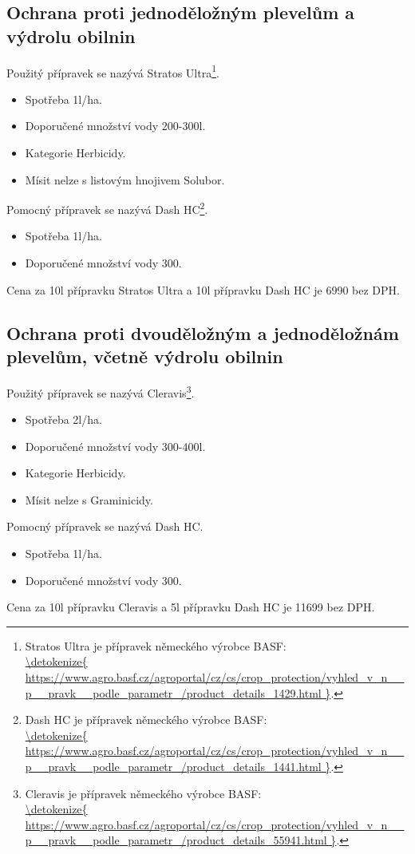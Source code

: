 \documentclass[11pt,a4paper,titlepage]{article}
\begin{document}
\subsection{Ochrana proti jednoděložným plevelům a výdrolu obilnin}
Použitý přípravek se nazývá Stratos Ultra\footnote{Stratos Ultra je přípravek německého výrobce BASF: \\\url{\detokenize{
https://www.agro.basf.cz/agroportal/cz/cs/crop_protection/vyhled_v_n__p__pravk__podle_parametr_/product_details_1429.html
}}.}.
\begin{itemize}
  \item Spotřeba 1l/ha.
  \item Doporučené množství vody 200-300l.
  \item Kategorie Herbicidy.
  \item Mísit nelze s listovým hnojivem Solubor.
\end{itemize}
Pomocný přípravek se nazývá Dash HC\footnote{Dash HC je přípravek německého výrobce BASF: \\\url{\detokenize{
https://www.agro.basf.cz/agroportal/cz/cs/crop_protection/vyhled_v_n__p__pravk__podle_parametr_/product_details_1441.html
}}.}.
\begin{itemize}
  \item Spotřeba 1l/ha.
  \item Doporučené množství vody 300.
\end{itemize}
Cena za 10l přípravku Stratos Ultra a 10l přípravku Dash HC je 6990 bez DPH.

\subsection{Ochrana proti dvouděložným a jednoděložnám plevelům, včetně výdrolu obilnin}
Použitý přípravek se nazývá Cleravis\footnote{Cleravis je přípravek německého výrobce BASF: \\\url{\detokenize{
https://www.agro.basf.cz/agroportal/cz/cs/crop_protection/vyhled_v_n__p__pravk__podle_parametr_/product_details_55941.html
}}.}.
\begin{itemize}
  \item Spotřeba 2l/ha.
  \item Doporučené množství vody 300-400l.
  \item Kategorie Herbicidy.
  \item Mísit nelze s Graminicidy.
\end{itemize}
Pomocný přípravek se nazývá Dash HC.
\begin{itemize}
  \item Spotřeba 1l/ha.
  \item Doporučené množství vody 300.
\end{itemize}
Cena za 10l přípravku Cleravis a 5l přípravku Dash HC je 11699 bez DPH.
\end{document}
